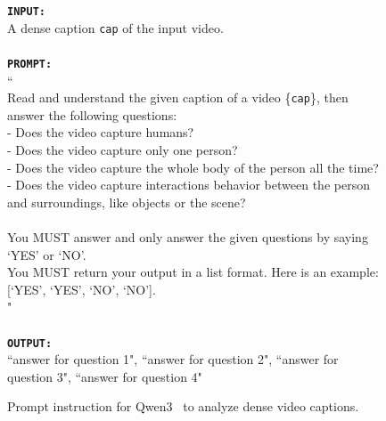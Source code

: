 \begin{figure}
    \begin{widecodebox}
        \texttt{\textbf{INPUT:}}\\
        A dense caption \texttt{cap} of the input video.\\
        \\
        \texttt{\textbf{PROMPT:}}\\
        ``\\
        Read and understand the given caption of a video \{\texttt{cap}\}, then answer the following questions:\\
        - Does the video capture humans?\\
        - Does the video capture only one person?\\
        - Does the video capture the whole body of the person all the time?\\
        - Does the video capture interactions behavior between the person and surroundings, like objects or the scene?\\
        \\
        You MUST answer and only answer the given questions by saying `YES' or `NO'.\\
        You MUST return your output in a list format. Here is an example: [`YES', `YES', `NO', `NO'].\\
        "\\
        \\
        \texttt{\textbf{OUTPUT:}}\\
        \text{[}``answer for question 1", ``answer for question 2", ``answer for question 3", ``answer for question 4"\text{]}
    \end{widecodebox}
    \vspace{-10pt}
    \caption{Prompt instruction for Qwen3~\cite{qwen3} to analyze dense video captions.}
\label{fig:qwen3_prompt}
\vspace{-15pt}
\end{figure}

